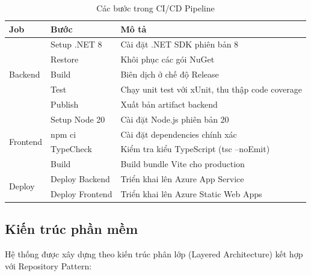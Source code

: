 \documentclass[a4paper]{article}
\begin{document}
\begin{table}[h!]
\centering
\caption{Các bước trong CI/CD Pipeline}
\begin{tabularx}{\textwidth}{|l|l|X|}
\hline
\textbf{Job} & \textbf{Bước} & \textbf{Mô tả} \\
\hline
\multirow{5}{*}{Backend} & Setup .NET 8 & Cài đặt .NET SDK phiên bản 8 \\
\cline{2-3}
& Restore & Khôi phục các gói NuGet \\
\cline{2-3}
& Build & Biên dịch ở chế độ Release \\
\cline{2-3}
& Test & Chạy unit test với xUnit, thu thập code coverage \\
\cline{2-3}
& Publish & Xuất bản artifact backend \\
\hline
\multirow{4}{*}{Frontend} & Setup Node 20 & Cài đặt Node.js phiên bản 20 \\
\cline{2-3}
& npm ci & Cài đặt dependencies chính xác \\
\cline{2-3}
& TypeCheck & Kiểm tra kiểu TypeScript (tsc --noEmit) \\
\cline{2-3}
& Build & Build bundle Vite cho production \\
\hline
\multirow{2}{*}{Deploy} & Deploy Backend & Triển khai lên Azure App Service \\
\cline{2-3}
& Deploy Frontend & Triển khai lên Azure Static Web Apps \\
\hline
\end{tabularx}
\end{table}

\subsection{Kiến trúc phần mềm}

Hệ thống được xây dựng theo kiến trúc phân lớp (Layered Architecture) kết hợp với Repository Pattern:

\begin{center}
\end{center}
\end{document}
